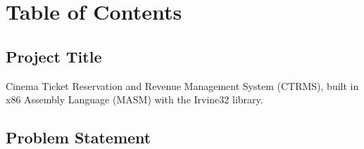 \documentclass{thesis-library}
\begin{document}
\newcommand{\thesisTitle}{Cinema Ticket Reservation and Revenue Management System (CTRMS)\\[0.3cm]\large Phase 1: Proposal \& Analysis}
\newcommand{\byLabel}{By (Group 102):}
\newcommand{\studentName}{\begin{tabular}{c}Noureddin Ghazal (202511039)\\ Yousef Kitaneh (202311043)\\ Ahmad Jahaf (202310390)\end{tabular}}
\newcommand{\supervisorLabel}{Instructor:}
\newcommand{\supervisorName}{Dr. Khaled Al-Hashash}
\newcommand{\degreeLineALabel}{This project was submitted in Partial Fulfilment of the Requirements for the Microcomputer Systems and Assembly Language Course (1301224)}
\newcommand{\majorName}{}
\newcommand{\universityName}{Applied Science Private University}
\newcommand{\deanshipName}{Faculty of Information Technology}
\newcommand{\regionName}{Amman - Jordan}
\newcommand{\degreeyearName}{2026}
\newcommand{\degreemonthName}{November}

\makecoverpage


\newpage
\chapter*{\centering \Huge Table of Contents}
\tableofcontents
{}

\newpage
\listoftablesname

\newpage
\listoffiguresname

\newpage
{}



\section{Project Title}

Cinema Ticket Reservation and Revenue Management System (CTRMS), built in x86 Assembly
Language (MASM) with the Irvine32 library.

\section{Problem Statement}
\end{document}
